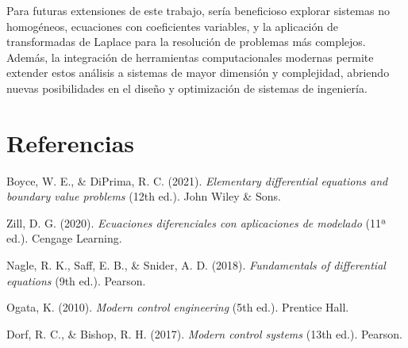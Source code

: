 \documentclass[12pt]{article}
\begin{document}
Para futuras extensiones de este trabajo, sería beneficioso explorar sistemas no homogéneos, ecuaciones con coeficientes variables, y la aplicación de transformadas de Laplace para la resolución de problemas más complejos. Además, la integración de herramientas computacionales modernas permite extender estos análisis a sistemas de mayor dimensión y complejidad, abriendo nuevas posibilidades en el diseño y optimización de sistemas de ingeniería.

\newpage

\section{Referencias}

\begin{thebibliography}{}

Boyce, W. E., \& DiPrima, R. C. (2021). \textit{Elementary differential equations and boundary value problems} (12th ed.). John Wiley \& Sons.

Zill, D. G. (2020). \textit{Ecuaciones diferenciales con aplicaciones de modelado} (11ª ed.). Cengage Learning.

Nagle, R. K., Saff, E. B., \& Snider, A. D. (2018). \textit{Fundamentals of differential equations} (9th ed.). Pearson.

Ogata, K. (2010). \textit{Modern control engineering} (5th ed.). Prentice Hall.

Dorf, R. C., \& Bishop, R. H. (2017). \textit{Modern control systems} (13th ed.). Pearson.

\end{thebibliography}
\end{document}
